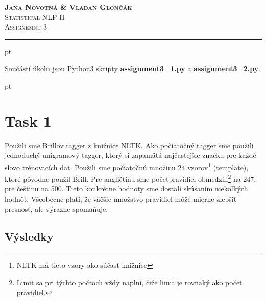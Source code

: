 \documentclass[a4paper, 10.5pt]{article}
\begin{document}
\noindent
\large\textsc{\textbf{Jana Novotná \& Vladan Glončák}}  \\
\normalsize \textsc{Statistical NLP II}\\
\textsc{Assignemnt 3}

\noindent\rule[0.5ex]{\linewidth}{1pt}

\newcommand{\norm}[1]{\left\lVert#1\right\rVert}

 pt

Součástí úkolu jsou Python3 skripty \textbf{assignment3\_1.py} a \textbf{assignment3\_2.py}.

 pt

\section*{Task 1}

Použili sme Brillov tagger z knižnice NLTK.
Ako počiatočný tagger sme použili jednoduchý unigramový tagger, ktorý si  zapamätá najčastejšie značku pre každé slovo trénovacích dat.
Použili sme počiatočnú množinu 24 vzorov\footnote{NLTK má tieto vzory ako súčasť knižnice} (template), ktoré pôvodne použil Brill. Pre angličtinu sme početpravidiel obmedzili\footnote{Limit sa pri týchto počtoch vždy naplní, čiže limit je rovnaký ako počet pravidiel.} na 247, pre češtinu na 500.
Tieto konkrétne hodnoty sme dostali skúšaním niekoľkých hodnôt.
Všeobecne platí, že väčšie množstvo pravidiel môže mierne zlepšiť presnosť, ale výrazne spomaňuje.

\subsection*{Výsledky}

\vskip 10pt
\end{document}
